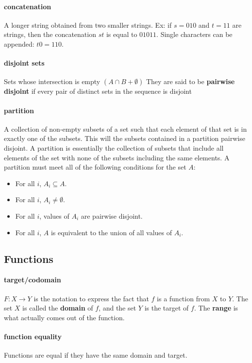 \documentclass[a4paper]{article}
\begin{document}
\paragraph{concatenation} A longer string obtained from two smaller strings. Ex: if $s=010$ and $t=11$ are strings, then the concatenation $st$ is equal to $01011$. Single characters can be appended: $t0 = 110$.

\paragraph{disjoint sets} Sets whose intersection is empty $(A \cap B + \emptyset)$ They are said to be \textbf{pairwise disjoint} if every pair of distinct sets in the sequence is disjoint
\paragraph{partition} A collection of non-empty subsets of a set such that each element of that set is in exactly one of the subsets. This will the subsets contained in a partition pairwise disjoint. A partition is essentially the collection of subsets that include all elements of the set with none of the subsets including the same elements. A partition must meet all of the following conditions for the set $A$:
\begin{itemize}
  \item For all $i$, $A_i \subseteq A$.
  \item For all $i$, $A_i \neq \emptyset$.
  \item For all $i$, values of $A_i$ are pairwise disjoint.
  \item For all $i$, $A$ is equivalent to the union of all values of $A_i$. 
\end{itemize}
\pagebreak
\subsection{Functions}
\paragraph{target/codomain} $F: X \to Y$ is the notation to express the fact that $f$ is a function from $X$ to $Y$. The set $X$ is called the \textbf{domain} of $f$, and the set $Y$ is the target of $f$. The \textbf{range} is what actually comes out of the function.
\paragraph{function equality} Functions are equal if they have the same domain and target.
\end{document}
